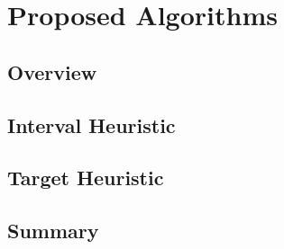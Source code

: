 \chapter{Proposed Algorithms}\label{propsedalgo}
\section{Overview}\label{proposedoverview}
\section{Interval Heuristic}\label{intervalh}
\section{Target Heuristic}\label{targeth}
\section{Summary}
